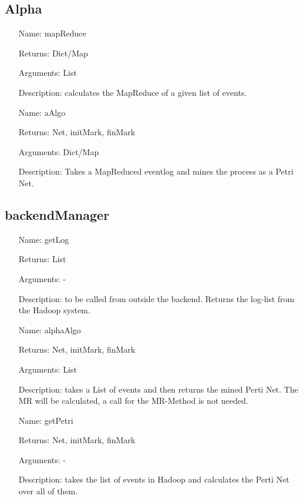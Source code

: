 \documentclass[runningheads]{llncs}
\begin{document}
\subsection{Alpha}
\begin{itemize}
\item[Name:] mapReduce
\item[Returns:] Dict/Map
\item[Arguments:] List
\item[Description:] calculates the MapReduce of a given list of events.
\end{itemize}

\begin{itemize}
\item[Name:] aAlgo
\item[Returns:] Net, initMark, finMark
\item[Arguments:] Dict/Map
\item[Description:] Takes a MapReduced eventlog and mines the process as a Petri Net.
\end{itemize}

\subsection{backendManager}
\begin{itemize}
\item[Name:] getLog
\item[Returns:] List
\item[Arguments:] -
\item[Description:] to be called from outside the backend. Returns the log-list from the Hadoop system.
\end{itemize}
\begin{itemize}
\item[Name:] alphaAlgo
\item[Returns:] Net, initMark, finMark
\item[Arguments:] List
\item[Description:] takes a List of events and then returns the mined Perti Net. The MR will be calculated, a call for the MR-Method is not needed.
\end{itemize}

\begin{itemize}
\item[Name:] getPetri
\item[Returns:] Net, initMark, finMark
\item[Arguments:] -
\item[Description:] takes the list of events in Hadoop and calculates the Perti Net over all of them.
\end{itemize}



\end{document}
